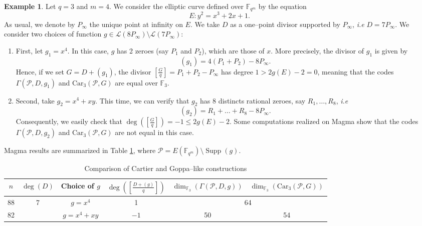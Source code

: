 \documentclass[a4paper]{amsart}
\theoremstyle{definition}
\newtheorem{example}[thm]{Example}
\theoremstyle{remark}
\newcommand{\calP}{\mathcal{P}}
\newcommand{\calL}{\mathcal{L}}
\newcommand{\fqm}{\mathbb{F}_{q^m}}
\newcommand{\Supp}{\operatorname{Supp}}
\begin{document}
\begin{example} \label{ex:Goppa_vs_Cartier}
Let $q=3$ and $m=4$. We consider the elliptic curve defined over $\fqm$ by the equation 
$$ E : y^2 = x^3+2x+1.$$
As usual, we denote by $P_\infty$ the unique point at infinity on $E$. We take $D$ as a one--point divisor supported by $P_\infty$, \emph{i.e} $D = 7P_\infty$. We consider two choices of function $g\in \calL(8P_\infty) \setminus \calL(7P_\infty)$:
\begin{enumerate}
\item First, let $g_1 = x^4$. In this case, $g$ has 2 zeroes (say $P_1$ and $P_2$), which are those of $x$. More precisely, the divisor of $g_1$ is given by
$$(g_1) = 4(P_1+P_2)-8P_\infty.$$ 
Hence, if we set $G = D+(g_1)$, the divisor $\left[\frac{G}{q}\right] = P_1+P_2-P_\infty$ has degree $1 > 2g(E)-2=0$, meaning that the codes $\Gamma(\calP,D,g_1)$ and $\mathrm{Car}_3(\calP,G)$ are equal over $\mathbb{F}_3$.

\item Second, take $g_2 = x^4 + xy$. This time, we can verify that $g_2$ has $8$ distincts rational zeroes, say $R_1,\dots, R_8$, \emph{i.e}
$$(g_2) = R_1 + \dots + R_8 - 8P_\infty.$$   
Consequently, we easily check that $\deg\left(\left[\frac{G}{q} \right]\right) = -1 \leq 2g(E)-2$. Some computations realized on Magma show that the codes $\Gamma(\calP,D,g_2)$ and $\mathrm{Car}_3(\calP,G)$ are not equal in this case.
\end{enumerate}
Magma results are summarized in Table \ref{table:example1}, where $\calP = E(\fqm) \setminus \Supp(g)$.
\begin{table}[h]
	\begin{center}
		\begin{tabular}{|c|c|c|c|c|c|}
			\hline
			$n$&  $\deg(D)$ & Choice of $g$ & $\deg\left(\left[\frac{D+(g)}{q} \right]\right)$  & $\dim_{\mathbb{F}_3}(\Gamma(\calP,D,g))$ &$\dim_{\mathbb{F}_3}(\mathrm{Car}_3(\calP,G))$ \\
			\hline \hline
			88 & \multirow{2}{*}{7} & $g = x^4$ & 1 & \multicolumn{2}{c|}{64} \\
			\cline{1-1}\cline{3-6} 
			82 &  & $g = x^4 + xy$ & $-1$ & 50 & 54 \\ 
			\hline
		\end{tabular}
		\vspace*{0.3em}
		\caption{Comparison of Cartier and Goppa--like constructions} \label{table:example1}
	\end{center}
\end{table}
\end{example}
\end{document}
